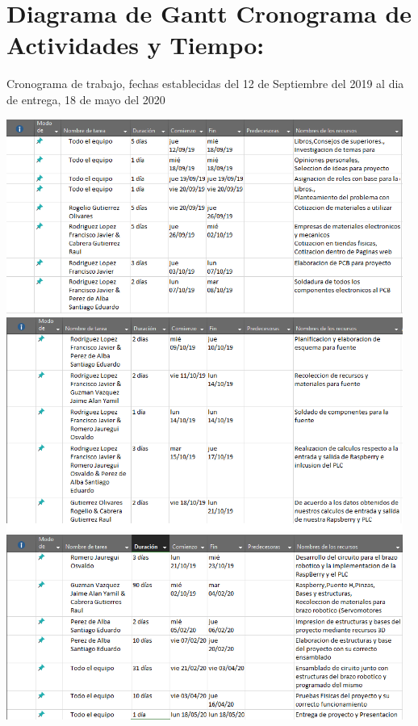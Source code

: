 \documentclass[14pt,a4paper]{article}
\begin{document}
\newpage
\section{Diagrama de Gantt Cronograma de Actividades y Tiempo:}
Cronograma de trabajo, fechas establecidas del 12 de  Septiembre del 2019 al dia de entrega, 18 de mayo del 2020

\begin{center}

\includegraphics[width=13cm]{Esquema1.png} 
\includegraphics[width=13cm]{Esquema2.png} 
\includegraphics[width=13cm]{Esquema3.png} 

\end{center}
\end{document}
